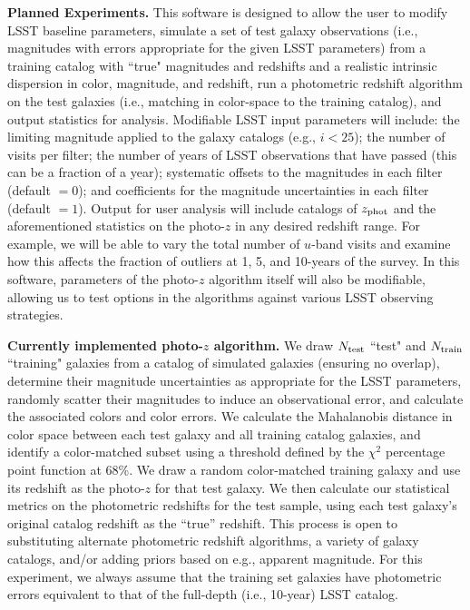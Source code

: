\textbf{Planned Experiments.} This software is designed to allow the
user to modify LSST baseline parameters, simulate a set of test galaxy
observations (i.e., magnitudes with errors appropriate for the given
LSST parameters) from a training catalog with ``true" magnitudes and
redshifts and a realistic intrinsic dispersion in color, magnitude, and
redshift, run a photometric redshift algorithm on the test galaxies
(i.e., matching in color-space to the training catalog), and output
statistics for analysis. Modifiable LSST input parameters will include:
the limiting magnitude applied to the galaxy catalogs (e.g., $i<25$);
the number of visits per filter; the number of years of LSST
observations that have passed (this can be a fraction of a year);
systematic offsets to the magnitudes in each filter (default $=0$); and
coefficients for the magnitude uncertainties in each filter (default
$=1$).  Output for user analysis will include catalogs of $z_{\rm phot}$
and the aforementioned statistics on the photo-$z$
in any desired redshift range. For example, we will be able to vary the
total number of $u$-band visits and examine how this affects the
fraction of outliers at 1, 5, and 10-years of the survey. In this
software, parameters of the photo-$z$ algorithm itself will also be
modifiable, allowing us to test options in the algorithms against
various LSST observing strategies.

\textbf{Currently implemented photo-$z$ algorithm.} We draw $N_{\rm
test}$ ``test" and $N_{\rm train}$ ``training" galaxies from a catalog of
simulated galaxies (ensuring no overlap), determine their
magnitude uncertainties as appropriate for the LSST parameters, randomly
scatter their magnitudes to induce an observational error, and calculate
the associated colors and color errors. We calculate the Mahalanobis
distance \citep{Mahalanobis1936} in color space between each test galaxy and all training
catalog galaxies, and identify a color-matched subset using a threshold
defined by the $\chi^2$ percentage point function at 68\%. We draw a
random color-matched training galaxy and use its redshift as the
photo-$z$ for that test galaxy. We then calculate our statistical
metrics on the photometric redshifts for the test sample, using each
test galaxy's original catalog redshift as the ``true'' redshift. This
process is open to substituting alternate photometric redshift
algorithms, a variety of galaxy catalogs, and/or adding priors based on
e.g., apparent magnitude. For this experiment, we always assume that the
training set galaxies have photometric errors equivalent to that of the
full-depth (i.e., 10-year) LSST catalog.


